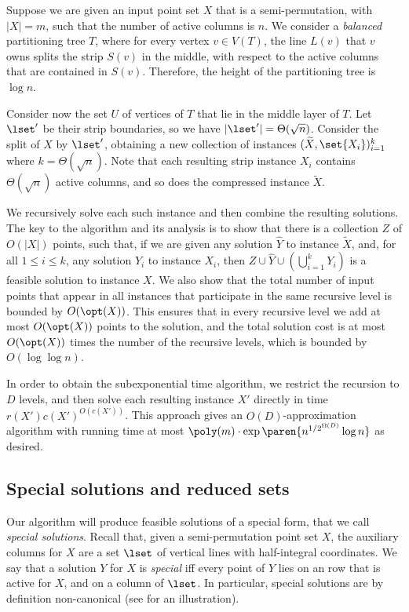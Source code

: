 \documentclass{toc}
\begin{document}
Suppose we are given an input point set $X$ that is a semi-permutation, with $|X|=m$, such that the number of active columns is $n$. We consider a \emph{balanced} partitioning tree $T$, where for every vertex $v\in V(T)$, the line $L(v)$ that $v$ owns splits the strip $S(v)$ in the middle, with respect to the active columns that are contained in $S(v)$. Therefore, the height of the partitioning tree is $\log n$.

Consider now the set $U$ of vertices of $T$ that lie in the middle layer of $T$. Let $\lset'$ be their strip boundaries, so we have $|\lset'| = \Theta(\sqrt{n})$. Consider the split of $X$ by $\lset'$,  obtaining a new collection of instances $(\widetilde{X}, \set{X_i})_{i=1}^k$ where $k = \Theta(\sqrt{n})$. Note that each resulting strip instance $X_i$ contains $\Theta(\sqrt{n})$ active columns, and so does the compressed instance $\widetilde{X}$.
 
We recursively solve each such instance and then  combine the resulting solutions.
The key to the algorithm and its analysis is to show that there is a collection $Z$ of $O(|X|)$ points, such that, if we are given any  solution $\widehat{Y}$ to instance $\widetilde{X}$, and, for all $1\leq i\leq k$, any  solution $Y_i$ to instance $X_i$, then $Z\cup \widehat{Y}\cup \left(\bigcup_{i=1}^k Y_i\right) $ is a feasible solution to instance $X$. We also show that the total number of input points that appear in all instances that participate in the same recursive level is bounded by $O(\opt(X))$. This ensures that in every recursive level we add at most $O(\opt(X))$ points to the solution, and the total solution cost is at most $O(\opt(X))$ times the number of the recursive levels, which is bounded by $O(\log\log n)$.

In order to obtain the subexponential time algorithm, we restrict the recursion to $D$ levels, and then solve each resulting instance $X'$ directly in time $r(X') c(X')^{O(c(X'))}$. %
This approach gives an $O(D)$-approximation algorithm with running time at most  $\poly(m)\cdot \exp\paren{n^{1/2^{\Omega(D)}} \log n}$ as desired. 
%
%

%
%
%
%

\subsection{Special solutions and reduced sets} %

Our algorithm will produce feasible solutions of a special form, that we call \emph{special solutions}. Recall that, given a semi-permutation point set $X$, the auxiliary columns for $X$ are a set $\lset$ of vertical lines with half-integral coordinates. We say that a solution $Y$ for $X$ is \emph{special} iff every point of $Y$ lies on an row that is active for $X$, and on a column of $\lset$. In particular, special solutions are by definition non-canonical (see  for an illustration).  
\end{document}
